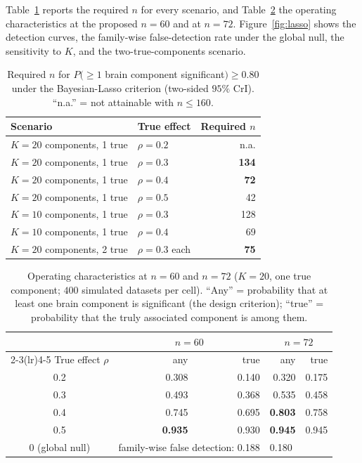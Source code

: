 \documentclass[11pt,a4paper]{article}
\begin{document}
Table~\ref{tab:nreq} reports the required $n$ for every scenario, and Table~\ref{tab:opera} the operating characteristics at the proposed $n=60$ and at $n=72$. Figure~\ref{fig:lasso} shows the detection curves, the family-wise false-detection rate under the global null, the sensitivity to $K$, and the two-true-components scenario.

\begin{table}[H]
\centering\small
\caption{Required $n$ for $P(\ge1$ brain component significant$)\ge0.80$ under the Bayesian-Lasso criterion (two-sided $95\%$ CrI). ``n.a.'' = not attainable with $n\le160$.}
\label{tab:nreq}
\begin{tabular}{llr}
\toprule
Scenario & True effect & Required $n$ \\
\midrule
\rowcolor{RowGrey}
$K=20$ components, 1 true & $\rho=0.2$ & n.a. \\
\rowcolor{RowGrey}
$K=20$ components, 1 true & $\rho=0.3$ & \textbf{134} \\
\rowcolor{RowGrey}
$K=20$ components, 1 true & $\rho=0.4$ & \textbf{72} \\
\rowcolor{RowGrey}
$K=20$ components, 1 true & $\rho=0.5$ & 42 \\
$K=10$ components, 1 true & $\rho=0.3$ & 128 \\
$K=10$ components, 1 true & $\rho=0.4$ & 69 \\
$K=20$ components, 2 true & $\rho=0.3$ each & \textbf{75} \\
\bottomrule
\end{tabular}
\end{table}

\begin{table}[H]
\centering\small
\caption{Operating characteristics at $n=60$ and $n=72$ ($K=20$, one true component; $400$ simulated datasets per cell). ``Any'' = probability that at least one brain component is significant (the design criterion); ``true'' = probability that the truly associated component is among them.}
\label{tab:opera}
\begin{tabular}{crrrr}
\toprule
 & \multicolumn{2}{c}{$n=60$} & \multicolumn{2}{c}{$n=72$}\\
\cmidrule(lr){2-3}\cmidrule(lr){4-5}
True effect $\rho$ & any & true & any & true\\
\midrule
0.2 & 0.308 & 0.140 & 0.320 & 0.175\\
0.3 & 0.493 & 0.368 & 0.535 & 0.458\\
0.4 & 0.745 & 0.695 & \textbf{0.803} & 0.758\\
0.5 & \textbf{0.935} & 0.930 & \textbf{0.945} & 0.945\\
\midrule
$0$ (global null) & \multicolumn{2}{l}{family-wise false detection: 0.188} &
\multicolumn{2}{l}{0.180}\\
\bottomrule
\end{tabular}
\end{table}
\end{document}

